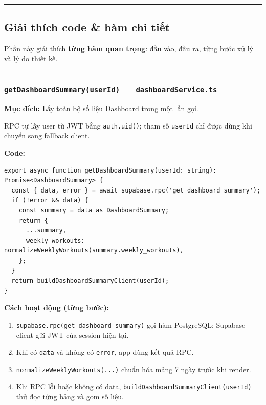 \documentclass[12pt,a4paper]{article}
\providecommand{\tightlist}{%
  \setlength{\itemsep}{0pt}\setlength{\parskip}{0pt}}
\begin{document}
\begin{center}\rule{0.5\linewidth}{0.5pt}\end{center}

\subsection{Giải thích code \& hàm chi
tiết}\label{giux1ea3i-thuxedch-code-huxe0m-chi-tiux1ebft}

Phần này giải thích \textbf{từng hàm quan trọng}: đầu vào, đầu ra, từng
bước xử lý và lý do thiết kế.

\begin{center}\rule{0.5\linewidth}{0.5pt}\end{center}

\subsubsection{\texorpdfstring{\texttt{getDashboardSummary(userId)} ---
\texttt{dashboardService.ts}}{getDashboardSummary(userId) --- dashboardService.ts}}\label{getdashboardsummaryuserid-dashboardservice.ts}

\textbf{Mục đích:} Lấy toàn bộ số liệu Dashboard trong một lần gọi.

RPC tự lấy user từ JWT bằng \texttt{auth.uid()}; tham số \texttt{userId}
chỉ được dùng khi chuyển sang fallback client.

\textbf{Code:}

\begin{verbatim}
export async function getDashboardSummary(userId: string): Promise<DashboardSummary> {
  const { data, error } = await supabase.rpc('get_dashboard_summary');
  if (!error && data) {
    const summary = data as DashboardSummary;
    return {
      ...summary,
      weekly_workouts: normalizeWeeklyWorkouts(summary.weekly_workouts),
    };
  }
  return buildDashboardSummaryClient(userId);
}

\end{verbatim}

\textbf{Cách hoạt động (từng bước):}

\begin{enumerate}
\def\labelenumi{\arabic{enumi}.}
\tightlist
\item
  \texttt{supabase.rpc(\textquotesingle{}get\_dashboard\_summary\textquotesingle{})}
  gọi hàm PostgreSQL; Supabase client gửi JWT của session hiện tại.
\item
  Khi có \texttt{data} và không có \texttt{error}, app dùng kết quả RPC.
\item
  \texttt{normalizeWeeklyWorkouts(...)} chuẩn hóa mảng 7 ngày trước khi
  render.
\item
  Khi RPC lỗi hoặc không có data,
  \texttt{buildDashboardSummaryClient(userId)} thử đọc từng bảng và gom
  số liệu.
\end{enumerate}
\end{document}
